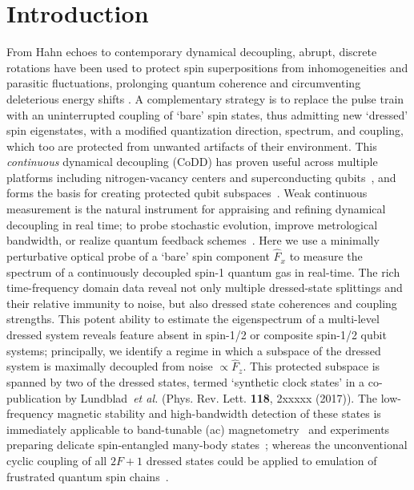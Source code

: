\documentclass[aps,prl,reprint,superscriptaddress,floatfix]{revtex4-1}
\begin{document}
\section{Introduction}
\label{sec:introduction}
From Hahn echoes to contemporary dynamical decoupling, abrupt, discrete rotations have been used to protect spin superpositions from inhomogeneities and parasitic fluctuations, prolonging quantum coherence and circumventing deleterious energy shifts .
A complementary strategy is to replace the pulse train with an uninterrupted coupling of `bare' spin states, thus admitting new `dressed' spin eigenstates, with a modified quantization direction, spectrum, and coupling, which too are protected from unwanted artifacts of their environment.
This \textit{continuous} dynamical decoupling (CoDD) has proven useful across multiple platforms including nitrogen-vacancy centers and superconducting qubits~\cite{golter_protecting_2014}, and forms the basis for creating protected qubit subspaces~\cite{aharon_general_2013}.
Weak continuous measurement is the natural instrument for appraising and refining dynamical decoupling in real time; to probe stochastic evolution, improve metrological bandwidth, or realize quantum feedback schemes~\cite{vijay_stabilizing_2012}.
Here we use a minimally perturbative  optical probe of a `bare' spin component $\hat{F}_x$ to measure the spectrum of a continuously decoupled spin-1 quantum gas in real-time.
The rich time-frequency domain data reveal not only multiple dressed-state splittings and their relative immunity to noise, but also dressed state coherences and coupling strengths.
This potent ability to estimate the eigenspectrum of a multi-level dressed system reveals feature absent in spin-1/2 or composite spin-1/2 qubit systems; principally, we identify a regime in which a subspace of the dressed system is maximally decoupled from noise $\propto \hat{F}_z$.
This protected subspace is spanned by two of the dressed states, termed `synthetic clock states' in a co-publication by Lundblad~\textit{et al.} (Phys. Rev. Lett. \textbf{118}, 2xxxxx (2017)).
The low-frequency magnetic stability and high-bandwidth detection of these states is immediately applicable to band-tunable (ac) magnetometry~\cite{loretz_radio-frequency_2013,ockeloen_quantum_2013,*horsley_frequency-tunable_2016} and experiments preparing delicate spin-entangled many-body states~\cite{stamper-kurn_spinor_2013}; whereas the unconventional cyclic coupling of all $2F+1$ dressed states could be applied to emulation of frustrated quantum spin chains~\cite{mikeska_one-dimensional_2004}.
\end{document}
